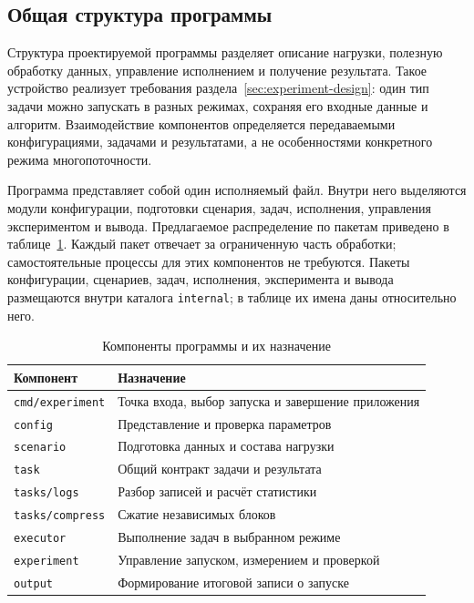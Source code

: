 \subsection{Общая структура программы}
\label{subsec:program-structure}

Структура проектируемой программы разделяет описание нагрузки, полезную обработку данных,
  управление исполнением и получение результата. Такое устройство реализует требования
  раздела~\ref{sec:experiment-design}: один тип задачи можно запускать в разных режимах,
  сохраняя его входные данные и алгоритм. Взаимодействие компонентов определяется передаваемыми
  конфигурациями, задачами и результатами, а не особенностями конкретного режима многопоточности.

Программа представляет собой один исполняемый файл. Внутри него выделяются модули конфигурации,
  подготовки сценария, задач, исполнения, управления экспериментом и вывода.
  Предлагаемое распределение по пакетам приведено в таблице~\ref{tab:program-modules}.
  Каждый пакет отвечает за ограниченную часть обработки; самостоятельные процессы для этих
  компонентов не требуются. Пакеты конфигурации, сценариев, задач, исполнения, эксперимента
  и вывода размещаются внутри каталога \texttt{internal}; в таблице их имена даны относительно него.

\begin{table}[htbp]
  \centering
  \caption{Компоненты программы и их назначение}
  \label{tab:program-modules}
  \begin{tabularx}{\textwidth}{|p{4.5cm}|X|}
    \hline
    Компонент & Назначение \\
    \hline
    \texttt{cmd/experiment} & Точка входа, выбор запуска и завершение приложения \\
    \hline
    \texttt{config} & Представление и проверка параметров \\
    \hline
    \texttt{scenario} & Подготовка данных и состава нагрузки \\
    \hline
    \texttt{task} & Общий контракт задачи и результата \\
    \hline
    \texttt{tasks/logs} & Разбор записей и расчёт статистики \\
    \hline
    \texttt{tasks/compress} & Сжатие независимых блоков \\
    \hline
    \texttt{executor} & Выполнение задач в выбранном режиме \\
    \hline
    \texttt{experiment} & Управление запуском, измерением и проверкой \\
    \hline
    \texttt{output} & Формирование итоговой записи о запуске \\
    \hline
  \end{tabularx}
\end{table}

